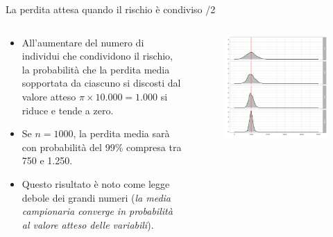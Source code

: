 \documentclass[aspectratio=64,12pt]{beamer}
\begin{document}
\begin{frame}{La perdita attesa quando il rischio è condiviso /2}
\begin{columns}
\begin{column}{.4\columnwidth}
\small
\begin{itemize}
\item All'aumentare del numero di individui che
condividono il rischio, la probabilità che la perdita media sopportata da
ciascuno si discosti dal valore atteso $\pi \times 10.000 = 1.000$ si
riduce e tende a zero.
\item Se $n=1000$, la perdita media sarà con probabilità del 99\% compresa
tra 750 e 1.250.
\item Questo risultato è noto come \alert{legge debole dei grandi numeri} (\emph{la media
campionaria converge in probabilità al valore atteso delle variabili}).
\end{itemize}
\end{column}
\begin{column}{.6\columnwidth}
\begin{figure}[htbp]
\centering
\includegraphics[width=\textwidth]{./figure/distribuzione-perdite-2.pdf}
\end{figure}
\end{column}
\end{columns}
\end{frame}
\end{document}
